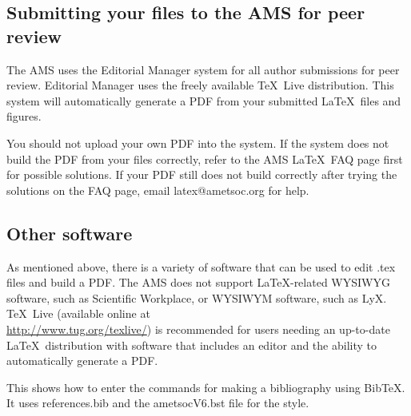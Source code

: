\documentclass{ametsocV6.2}
\begin{document}
\subsection{Submitting your files to the AMS for peer review}
The AMS uses the Editorial Manager system for all author submissions for
peer review. Editorial Manager uses the freely available \TeX\ Live
distribution. This system will automatically generate a PDF from your
submitted \LaTeX\ files and figures.  

You should not upload your own PDF into
the system. If the system does not build the PDF from your files correctly,
refer to the AMS \LaTeX\ FAQ page first for possible solutions. If your PDF
still does not build correctly after trying the solutions on the FAQ page, email
latex@ametsoc.org for help.

\subsection{Other software}
As mentioned above, there is a variety of software that can be used to edit
.tex files and build a PDF.  The AMS does not support \LaTeX\/-related
WYSIWYG software, such as Scientific Workplace, or WYSIWYM software, such as
LyX.  \TeX\ Live (available online at \\ \url{http://www.tug.org/texlive/}) is
recommended for users needing an up-to-date \LaTeX\ distribution with
software that includes an editor and the ability to automatically generate a
PDF.




\clearpage

 This shows how to enter the commands for making a bibliography using
 BibTeX. It uses references.bib and the ametsocV6.bst file for the style.



\end{document}
